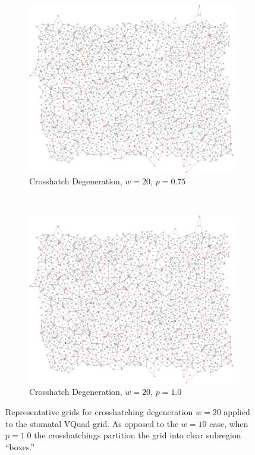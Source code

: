 \documentclass[a4paper,11pt,twoside]{report}
\begin{document}
\begin{figure}[htp]
\begin{subfigure}[t]{0.4\textwidth}
  \end{subfigure}

\begin{subfigure}[t]{0.4\textwidth}
  \centering
  \includegraphics[width=\textwidth]{ch6_figs/cross_hatch_p75_w20}
  \caption{Crosshatch Degeneration, $w=20$, $p=0.75$}

  \end{subfigure}
~
\begin{subfigure}[t]{0.4\textwidth}
  \centering
  \includegraphics[width=\textwidth]{ch6_figs/cross_hatch_p100_w20}
  \caption{Crosshatch Degeneration, $w=20$, $p=1.0$}

  \end{subfigure}

\caption[Crosshatch Degeneration, $w=20$]{
  Representative grids for crosshatching degeneration $w=20$ applied to the stomatal VQuad grid. As opposed to the $w=10$ case, when $p=1.0$ the crosshatchings partition the grid into clear subregion ``boxes.''
}
\label{fig:ch_w20_grid}
\end{figure}
\end{document}
